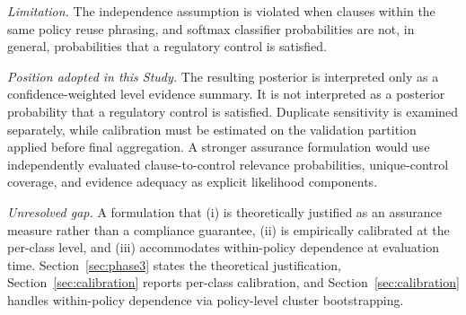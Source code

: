 \documentclass[final,3p,times,twocolumn]{elsarticle}
\begin{document}
    \emph{Limitation.} The
	independence assumption is violated when clauses within the same policy reuse
	phrasing, and softmax classifier probabilities are not, in general, probabilities
	that a regulatory control is satisfied. 

    \emph{Position adopted in this Study.} 
    The resulting posterior is interpreted only as a confidence-weighted level evidence summary. It is not 
    interpreted as a posterior probability that a regulatory control is satisfied. Duplicate sensitivity is examined 
    separately, while calibration must be estimated on the validation partition applied before final aggregation. 
    A stronger assurance formulation would use independently evaluated clause-to-control relevance 
    probabilities, unique-control coverage, and evidence adequacy as explicit likelihood components.
    
    \emph{Unresolved gap.} A formulation that
	(i) is theoretically justified as an assurance measure rather than a compliance
	guarantee, (ii) is empirically calibrated at the per-class level, and (iii) accommodates
	within-policy dependence at evaluation time. Section~\ref{sec:phase3} states
	the theoretical justification, Section~\ref{sec:calibration} reports per-class
	calibration, and Section~\ref{sec:calibration} handles within-policy
	dependence via policy-level cluster bootstrapping.
\end{document}
